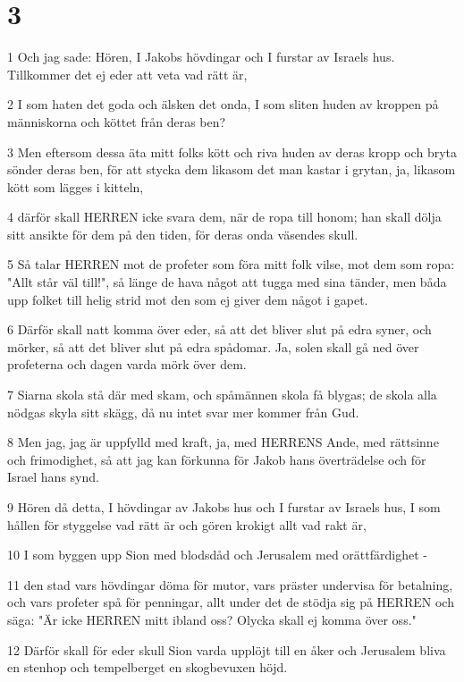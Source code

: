 \chapter{3}

\par 1 Och jag sade: Hören, I Jakobs hövdingar och I furstar av Israels hus. Tillkommer det ej eder att veta vad rätt är,
\par 2 I som haten det goda och älsken det onda, I som sliten huden av kroppen på människorna och köttet från deras ben?
\par 3 Men eftersom dessa äta mitt folks kött och riva huden av deras kropp och bryta sönder deras ben, för att stycka dem likasom det man kastar i grytan, ja, likasom kött som lägges i kitteln,
\par 4 därför skall HERREN icke svara dem, när de ropa till honom; han skall dölja sitt ansikte för dem på den tiden, för deras onda väsendes skull.
\par 5 Så talar HERREN mot de profeter som föra mitt folk vilse, mot dem som ropa: "Allt står väl till!", så länge de hava något att tugga med sina tänder, men båda upp folket till helig strid mot den som ej giver dem något i gapet.
\par 6 Därför skall natt komma över eder, så att det bliver slut på edra syner, och mörker, så att det bliver slut på edra spådomar. Ja, solen skall gå ned över profeterna och dagen varda mörk över dem.
\par 7 Siarna skola stå där med skam, och spåmännen skola få blygas; de skola alla nödgas skyla sitt skägg, då nu intet svar mer kommer från Gud.
\par 8 Men jag, jag är uppfylld med kraft, ja, med HERRENS Ande, med rättsinne och frimodighet, så att jag kan förkunna för Jakob hans överträdelse och för Israel hans synd.
\par 9 Hören då detta, I hövdingar av Jakobs hus och I furstar av Israels hus, I som hållen för styggelse vad rätt är och gören krokigt allt vad rakt är,
\par 10 I som byggen upp Sion med blodsdåd och Jerusalem med orättfärdighet -
\par 11 den stad vars hövdingar döma för mutor, vars präster undervisa för betalning, och vars profeter spå för penningar, allt under det de stödja sig på HERREN och säga: "Är icke HERREN mitt ibland oss? Olycka skall ej komma över oss."
\par 12 Därför skall för eder skull Sion varda upplöjt till en åker och Jerusalem bliva en stenhop och tempelberget en skogbevuxen höjd.

